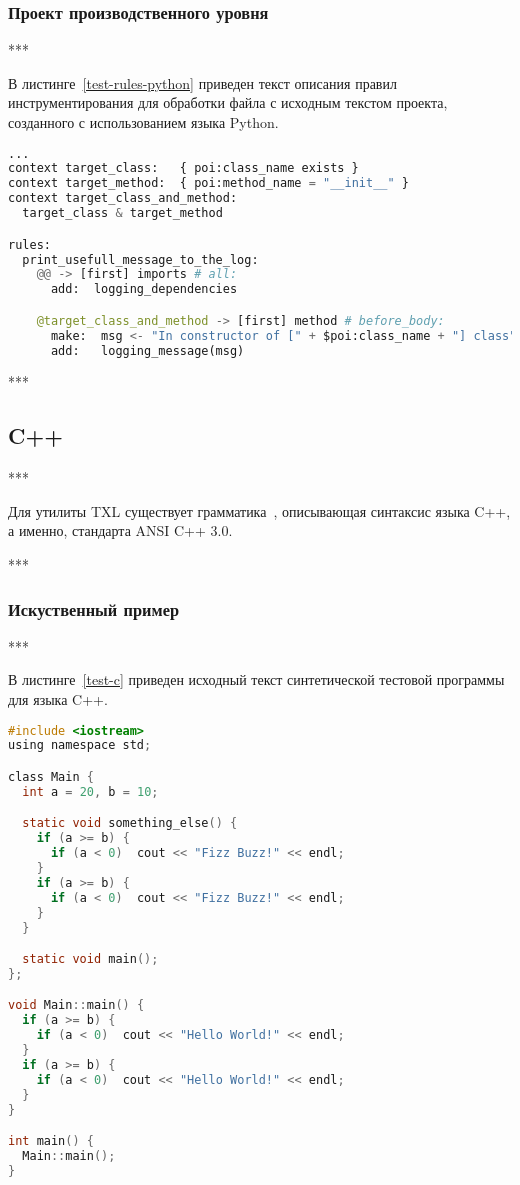\subsubsection{Проект производственного уровня}

***

В листинге~\ref{test-rules-python} приведен текст описания правил инструментирования для обработки файла с исходным текстом проекта, созданного с использованием языка Python.

\begin{lstlisting}[frame=single, language=Python, label={test-rules-python}, caption={Описание правил инструментирования. Python-проект.}]
...
context target_class:   { poi:class_name exists }
context target_method:  { poi:method_name = "__init__" }
context target_class_and_method:
  target_class & target_method

rules:
  print_usefull_message_to_the_log:
    @@ -> [first] imports # all:
      add:  logging_dependencies

    @target_class_and_method -> [first] method # before_body:
      make:  msg <- "In constructor of [" + $poi:class_name + "] class";
      add:   logging_message(msg)
\end{lstlisting}

***

\subsection{C++}

***

Для утилиты TXL существует грамматика~\cite{txl-resources}, описывающая синтаксис языка C++, а именно, стандарта ANSI C++ 3.0.

***

\subsubsection{Искуственный пример}

***

В листинге~\ref{test-c} приведен исходный текст синтетической тестовой программы для языка C++.

\begin{lstlisting}[frame=single, language=C, label={test-c}, caption={Исходный текст тестового приложения.}]
#include <iostream>
using namespace std;

class Main {
  int a = 20, b = 10;

  static void something_else() {
    if (a >= b) {
      if (a < 0)  cout << "Fizz Buzz!" << endl;
    }
    if (a >= b) {
      if (a < 0)  cout << "Fizz Buzz!" << endl;
    }
  }

  static void main();
};

void Main::main() {
  if (a >= b) {
    if (a < 0)  cout << "Hello World!" << endl;
  }
  if (a >= b) {
    if (a < 0)  cout << "Hello World!" << endl;
  }
}

int main() {
  Main::main();
}
\end{lstlisting}

